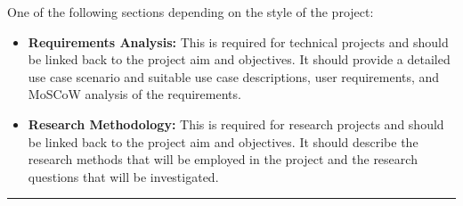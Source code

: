 
One of the following sections depending on the style of the project:  
\begin{itemize}
\item \textbf{Requirements  Analysis:}  This  is  required  for  technical  projects  and  should  be 
                                        linked back to the project aim and objectives. It should provide a detailed use case 
                                        scenario  and  suitable  use  case  descriptions,  user  requirements,  and  MoSCoW 
                                        analysis of the requirements.  
\item \textbf{Research  Methodology:} This  is  required  for  research  projects  and  should  be 
                                      linked  back  to  the  project  aim  and  objectives.  It  should  describe  the  research 
                                      methods that will be employed in the project and the research questions that will 
                                      be investigated.
\end{itemize}

\rule{\textwidth}{2pt}

\lipsum
